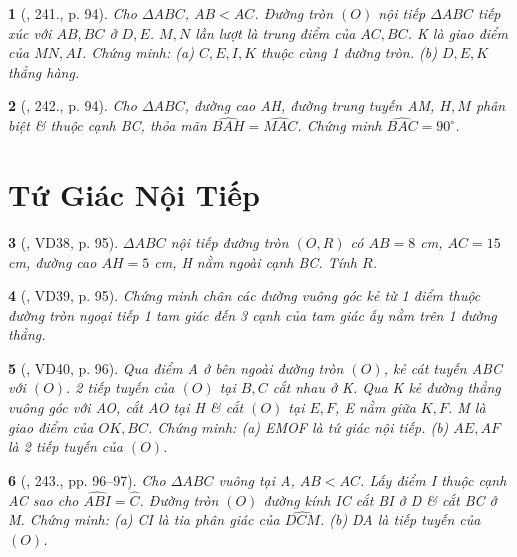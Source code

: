 \documentclass{article}
\newtheorem{baitoan}{}
\begin{document}
\begin{baitoan}[\cite{Binh_Toan_9_tap_2}, 241., p. 94]
	Cho $\Delta ABC$, $AB < AC$. Đường tròn $(O)$ nội tiếp $\Delta ABC$ tiếp xúc với $AB,BC$ ở $D,E$. $M,N$ lần lượt là trung điểm của $AC,BC$. K là giao điểm của $MN,AI$. Chứng minh: (a) $C,E,I,K$ thuộc cùng 1 đường tròn. (b) $D,E,K$ thẳng hàng.
\end{baitoan}

\begin{baitoan}[\cite{Binh_Toan_9_tap_2}, 242., p. 94]
	Cho $\Delta ABC$, đường cao AH, đường trung tuyến AM, $H,M$ phân biệt \& thuộc cạnh BC, thỏa mãn $\widehat{BAH} = \widehat{MAC}$. Chứng minh $\widehat{BAC} = 90^\circ$.
\end{baitoan}


\section{Tứ Giác Nội Tiếp}

\begin{baitoan}[\cite{Binh_Toan_9_tap_2}, VD38, p. 95]
	$\Delta ABC$ nội tiếp đường tròn $(O,R)$ có $AB = 8$ {\rm cm}, $AC = 15$ {\rm cm}, đường cao $AH = 5$ {\rm cm}, H nằm ngoài cạnh BC. Tính $R$.
\end{baitoan}

\begin{baitoan}[\cite{Binh_Toan_9_tap_2}, VD39, p. 95]
	Chứng minh chân các đường vuông góc kẻ từ 1 điểm thuộc đường tròn ngoại tiếp 1 tam giác đến 3 cạnh của tam giác ấy nằm trên 1 đường thẳng.
\end{baitoan}

\begin{baitoan}[\cite{Binh_Toan_9_tap_2}, VD40, p. 96]
	Qua điểm A ở bên ngoài đường tròn $(O)$, kẻ cát tuyến ABC với $(O)$. 2 tiếp tuyến của $(O)$ tại $B,C$ cắt nhau ở K. Qua K kẻ đường thẳng vuông góc với AO, cắt AO tại H \& cắt $(O)$ tại $E,F$, E nằm giữa $K,F$. M là giao điểm của $OK,BC$. Chứng minh: (a) EMOF là tứ giác nội tiếp. (b) $AE,AF$ là 2 tiếp tuyến của $(O)$.
\end{baitoan}

\begin{baitoan}[\cite{Binh_Toan_9_tap_2}, 243., pp. 96--97]
	Cho $\Delta ABC$ vuông tại A, $AB < AC$. Lấy điểm I thuộc cạnh AC sao cho $\widehat{ABI} = \widehat{C}$. Đường tròn $(O)$ đường kính IC cắt BI ở D \& cắt BC ở M. Chứng minh: (a) CI là tia phân giác của $\widehat{DCM}$. (b) DA là tiếp tuyến của $(O)$.
\end{baitoan}
\end{document}

